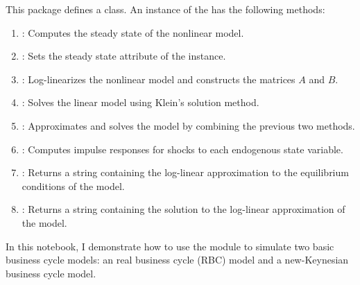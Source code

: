 \documentclass[letterpaper,10pt,openany,oneside,english]{sphinxmanual}
\begin{document}
This package defines a  class. An instance of the
 has the following methods:
\begin{enumerate}
\item {} 
: Computes the steady state of
the nonlinear model.

\item {} 
: Sets the steady state  attribute of
the instance.

\item {} 
:
Log-linearizes the nonlinear model and constructs the matrices
\(A\) and \(B\).

\item {} 
: Solves the linear model using Klein's solution
method.

\item {} 
: Approximates and solves the
model by combining the previous two methods.

\item {} 
: Computes impulse responses for
shocks to each endogenous state variable.

\item {} 
: Returns a string containing the
log-linear approximation to the equilibrium conditions of the model.

\item {} 
: Returns a string containing the solution
to the log-linear approximation of the model.

\end{enumerate}

In this notebook, I demonstrate how to use the module to simulate two
basic business cycle models: an real business cycle (RBC) model and a
new-Keynesian business cycle model.
\end{document}
